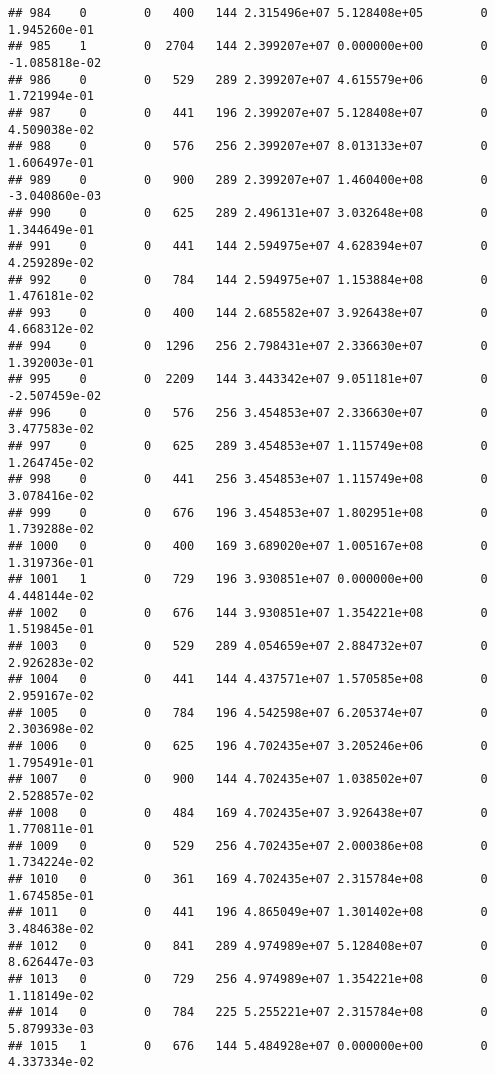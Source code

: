 \documentclass[
]{article}
\begin{document}
\begin{enumerate}
\begin{verbatim}
## 984    0        0   400   144 2.315496e+07 5.128408e+05        0  1.945260e-01
## 985    1        0  2704   144 2.399207e+07 0.000000e+00        0 -1.085818e-02
## 986    0        0   529   289 2.399207e+07 4.615579e+06        0  1.721994e-01
## 987    0        0   441   196 2.399207e+07 5.128408e+07        0  4.509038e-02
## 988    0        0   576   256 2.399207e+07 8.013133e+07        0  1.606497e-01
## 989    0        0   900   289 2.399207e+07 1.460400e+08        0 -3.040860e-03
## 990    0        0   625   289 2.496131e+07 3.032648e+08        0  1.344649e-01
## 991    0        0   441   144 2.594975e+07 4.628394e+07        0  4.259289e-02
## 992    0        0   784   144 2.594975e+07 1.153884e+08        0  1.476181e-02
## 993    0        0   400   144 2.685582e+07 3.926438e+07        0  4.668312e-02
## 994    0        0  1296   256 2.798431e+07 2.336630e+07        0  1.392003e-01
## 995    0        0  2209   144 3.443342e+07 9.051181e+07        0 -2.507459e-02
## 996    0        0   576   256 3.454853e+07 2.336630e+07        0  3.477583e-02
## 997    0        0   625   289 3.454853e+07 1.115749e+08        0  1.264745e-02
## 998    0        0   441   256 3.454853e+07 1.115749e+08        0  3.078416e-02
## 999    0        0   676   196 3.454853e+07 1.802951e+08        0  1.739288e-02
## 1000   0        0   400   169 3.689020e+07 1.005167e+08        0  1.319736e-01
## 1001   1        0   729   196 3.930851e+07 0.000000e+00        0  4.448144e-02
## 1002   0        0   676   144 3.930851e+07 1.354221e+08        0  1.519845e-01
## 1003   0        0   529   289 4.054659e+07 2.884732e+07        0  2.926283e-02
## 1004   0        0   441   144 4.437571e+07 1.570585e+08        0  2.959167e-02
## 1005   0        0   784   196 4.542598e+07 6.205374e+07        0  2.303698e-02
## 1006   0        0   625   196 4.702435e+07 3.205246e+06        0  1.795491e-01
## 1007   0        0   900   144 4.702435e+07 1.038502e+07        0  2.528857e-02
## 1008   0        0   484   169 4.702435e+07 3.926438e+07        0  1.770811e-01
## 1009   0        0   529   256 4.702435e+07 2.000386e+08        0  1.734224e-02
## 1010   0        0   361   169 4.702435e+07 2.315784e+08        0  1.674585e-01
## 1011   0        0   441   196 4.865049e+07 1.301402e+08        0  3.484638e-02
## 1012   0        0   841   289 4.974989e+07 5.128408e+07        0  8.626447e-03
## 1013   0        0   729   256 4.974989e+07 1.354221e+08        0  1.118149e-02
## 1014   0        0   784   225 5.255221e+07 2.315784e+08        0  5.879933e-03
## 1015   1        0   676   144 5.484928e+07 0.000000e+00        0  4.337334e-02

\end{verbatim}
\end{enumerate}
\end{document}
